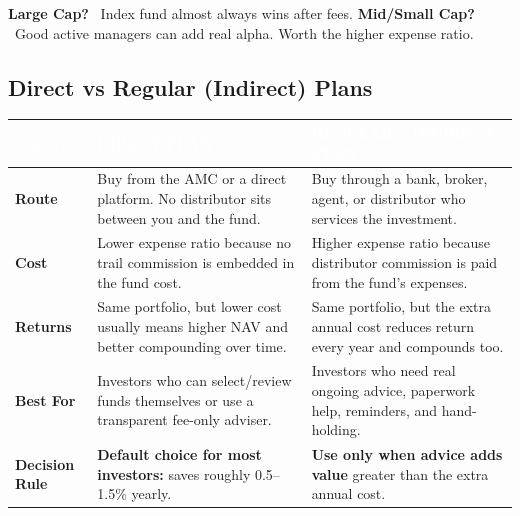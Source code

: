 \documentclass[11pt,a4paper]{article}
\begin{document}
\begin{tipbox}[title=\ding{72} Golden Rule on Active vs Passive]
\textbf{Large Cap?} \textrightarrow\ Index fund almost always wins after fees.
\textbf{Mid/Small Cap?} \textrightarrow\ Good active managers can add real alpha.  Worth the higher expense ratio.
\end{tipbox}

\subsection{Direct vs Regular (Indirect) Plans}

\begingroup
\renewcommand{\arraystretch}{1.28}
\setlength{\tabcolsep}{5pt}
\begin{tabularx}{\linewidth}{|>{\bfseries\footnotesize\sffamily\color{primary}}p{2.35cm}|>{\raggedright\arraybackslash\footnotesize\sffamily}X|>{\raggedright\arraybackslash\footnotesize\sffamily}X|}
\hline
\rowcolor{primary!88}
\textcolor{white}{Feature} & \textcolor{white}{DIRECT PLAN} & \textcolor{white}{REGULAR / INDIRECT PLAN} \\
\hline
\rowcolor{lightbg}
Route & Buy from the AMC or a direct platform. No distributor sits between you and the fund. & Buy through a bank, broker, agent, or distributor who services the investment. \\
\hline
Cost & Lower expense ratio because no trail commission is embedded in the fund cost. & Higher expense ratio because distributor commission is paid from the fund's expenses. \\
\hline
\rowcolor{lightbg}
Returns & Same portfolio, but lower cost usually means higher NAV and better compounding over time. & Same portfolio, but the extra annual cost reduces return every year and compounds too. \\
\hline
Best For & Investors who can select/review funds themselves or use a transparent fee-only adviser. & Investors who need real ongoing advice, paperwork help, reminders, and hand-holding. \\
\hline
\rowcolor{positive!10}
Decision Rule & \textcolor{positive!70!black}{\textbf{Default choice for most investors:} saves roughly 0.5--1.5\% yearly.} & \textcolor{negative!75!black}{\textbf{Use only when advice adds value} greater than the extra annual cost.} \\
\hline
\end{tabularx}
\endgroup

\end{document}
